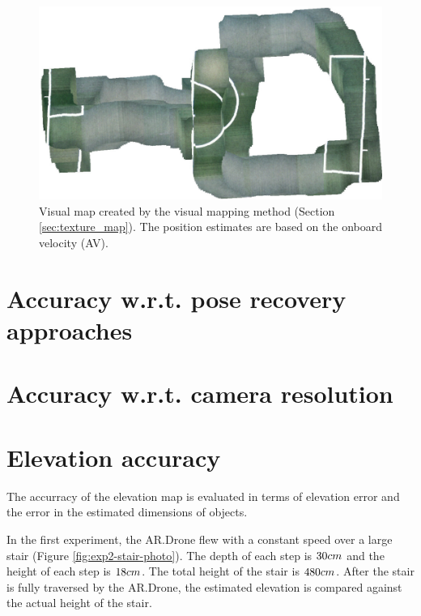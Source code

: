 \begin{figure}[htb!]
\centering
\includegraphics[width=0.75\linewidth]{images/exp1-run2-map.jpg}
\caption{Visual map created by the visual mapping method (Section \ref{sec:texture_map}). The position estimates are based on the onboard velocity (AV).}
\label{fig:exp1-notexture-map}
\end{figure}



\section{Accuracy w.r.t. pose recovery approaches}


\section{Accuracy w.r.t. camera resolution}



\section{Elevation accuracy}
\label{sec:results-elevation-accuracy}
The accurracy of the elevation map is evaluated in terms of elevation error and the error in the estimated dimensions of objects.

In the first experiment, the AR.Drone flew with a constant speed over a large stair (Figure \ref{fig:exp2-stair-photo}).
The depth of each step is $30\begin{small}cm\end{small}$ and the height of each step is $18\begin{small}cm\end{small}$.
The total height of the stair is $480\begin{small}cm\end{small}$.
After the stair is fully traversed by the AR.Drone, the estimated elevation is compared against the actual height of the stair.


